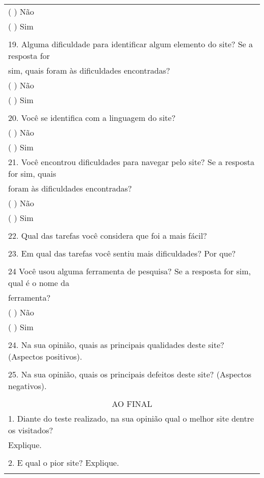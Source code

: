 \begin{center}
\begin{longtable}{l}
(   ) Não \\ 
(   ) Sim                     \\ 
\hline
\multicolumn{1}{|l|}{} \\ 
\hline
19.	Alguma dificuldade para identificar algum elemento do site? Se a resposta for \\sim, quais foram às dificuldades encontradas? \\ 
(   ) Não \\ 
(   ) Sim                     \\ 
\hline
\multicolumn{1}{|l|}{} \\ 
\hline
20.	Você se identifica com a linguagem do site? \\ 
(   ) Não \\ 
(   ) Sim                 \\ 
21.	Você encontrou dificuldades para navegar pelo site? Se a resposta for sim, quais \\foram às dificuldades encontradas? \\ 
(   ) Não \\ 
(   ) Sim                \\ 
\hline
\multicolumn{1}{|l|}{} \\ 
\hline
22.	Qual das tarefas você considera que foi a mais fácil? \\ 
\hline
\multicolumn{1}{|l|}{} \\ 
\hline
23.	Em qual das tarefas você sentiu mais dificuldades? Por que? \\ 
\hline
\multicolumn{1}{|l|}{} \\ 
\hline
24	Você usou alguma ferramenta de pesquisa? Se a resposta for sim, qual é o nome da \\ferramenta? \\ 
(   ) Não \\ 
(   ) Sim                  \\ 
\hline
\multicolumn{1}{|l|}{} \\ 
\hline
24.	Na sua opinião, quais as principais qualidades deste site? (Aspectos positivos). \\ 
\hline
\multicolumn{1}{|l|}{} \\ 
\hline
25.	Na sua opinião, quais os principais defeitos deste site? (Aspectos negativos). \\ 
\hline
\multicolumn{1}{|l|}{} \\ 
\hline
\multicolumn{1}{c}{AO FINAL} \\ 
1.	Diante do teste realizado, na sua opinião qual o melhor site dentre os visitados? \\Explique. \\ 
\hline
\multicolumn{1}{|c|}{} \\ 
\hline
2.	E qual o pior site? Explique. \\ 
\hline
\multicolumn{1}{|c|}{} \\ 

\hline
\end{longtable}
\end{center}